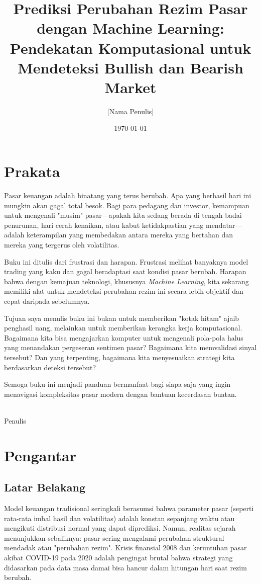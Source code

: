 \documentclass[12pt,a4paper]{book}
\title{Prediksi Perubahan Rezim Pasar dengan Machine Learning:\\
Pendekatan Komputasional untuk Mendeteksi Bullish dan Bearish Market}
\author{[Nama Penulis]}
\date{\today}
\begin{document}
\maketitle

\tableofcontents

\chapter*{Prakata}
Pasar keuangan adalah binatang yang terus berubah. Apa yang berhasil hari ini mungkin akan gagal total besok. Bagi para pedagang dan investor, kemampuan untuk mengenali "musim" pasar---apakah kita sedang berada di tengah badai penurunan, hari cerah kenaikan, atau kabut ketidakpastian yang mendatar---adalah keterampilan yang membedakan antara mereka yang bertahan dan mereka yang tergerus oleh volatilitas.

Buku ini ditulis dari frustrasi dan harapan. Frustrasi melihat banyaknya model trading yang kaku dan gagal beradaptasi saat kondisi pasar berubah. Harapan bahwa dengan kemajuan teknologi, khususnya \textit{Machine Learning}, kita sekarang memiliki alat untuk mendeteksi perubahan rezim ini secara lebih objektif dan cepat daripada sebelumnya.

Tujuan saya menulis buku ini bukan untuk memberikan "kotak hitam" ajaib penghasil uang, melainkan untuk memberikan kerangka kerja komputasional. Bagaimana kita bisa mengajarkan komputer untuk mengenali pola-pola halus yang menandakan pergeseran sentimen pasar? Bagaimana kita memvalidasi sinyal tersebut? Dan yang terpenting, bagaimana kita menyesuaikan strategi kita berdasarkan deteksi tersebut?

Semoga buku ini menjadi panduan bermanfaat bagi siapa saja yang ingin menavigasi kompleksitas pasar modern dengan bantuan kecerdasan buatan.

\vspace{1cm}
\\
Penulis

\chapter*{Pengantar}
\section*{Latar Belakang}
Model keuangan tradisional seringkali berasumsi bahwa parameter pasar (seperti rata-rata imbal hasil dan volatilitas) adalah konstan sepanjang waktu atau mengikuti distribusi normal yang dapat diprediksi. Namun, realitas sejarah menunjukkan sebaliknya: pasar sering mengalami perubahan struktural mendadak atau "perubahan rezim". Krisis finansial 2008 dan keruntuhan pasar akibat COVID-19 pada 2020 adalah pengingat brutal bahwa strategi yang didasarkan pada data masa damai bisa hancur dalam hitungan hari saat rezim berubah.
\end{document}
